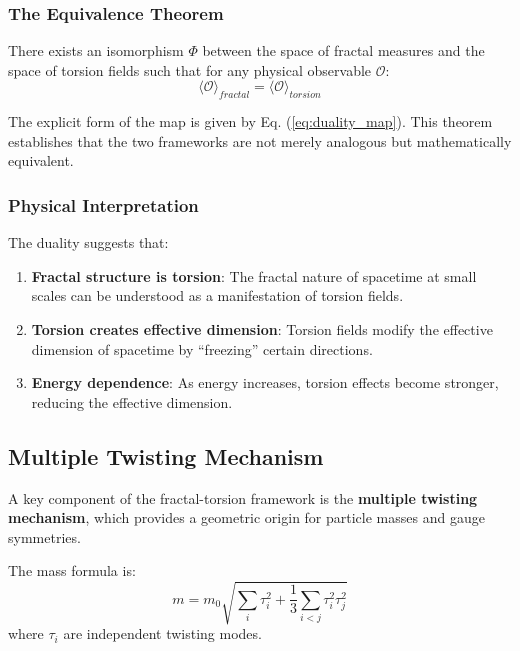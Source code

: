 \documentclass[UTF8]{ctex}\n\documentclass[12pt,a4paper]{article}
\begin{document}
\subsubsection{The Equivalence Theorem}

\begin{theorem}
There exists an isomorphism $\Phi$ between the space of fractal measures and the space of torsion fields such that for any physical observable $\mathcal{O}$:
\begin{equation}
    \langle\mathcal{O}\rangle_{fractal} = \langle\mathcal{O}\rangle_{torsion}
\end{equation}
\end{theorem}

The explicit form of the map is given by Eq. (\ref{eq:duality_map}). This theorem establishes that the two frameworks are not merely analogous but mathematically equivalent.

\subsubsection{Physical Interpretation}

The duality suggests that:
\begin{enumerate}
    \item \textbf{Fractal structure is torsion}: The fractal nature of spacetime at small scales can be understood as a manifestation of torsion fields.
    \item \textbf{Torsion creates effective dimension}: Torsion fields modify the effective dimension of spacetime by ``freezing'' certain directions.
    \item \textbf{Energy dependence}: As energy increases, torsion effects become stronger, reducing the effective dimension.
\end{enumerate}

\subsection{Multiple Twisting Mechanism}

A key component of the fractal-torsion framework is the \textbf{multiple twisting mechanism}, which provides a geometric origin for particle masses and gauge symmetries.

The mass formula is:
\begin{equation}
    m = m_0 \sqrt{\sum_i \tau_i^2 + \frac{1}{3}\sum_{i<j} \tau_i^2 \tau_j^2}
\end{equation}
where $\tau_i$ are independent twisting modes.
\end{document}
